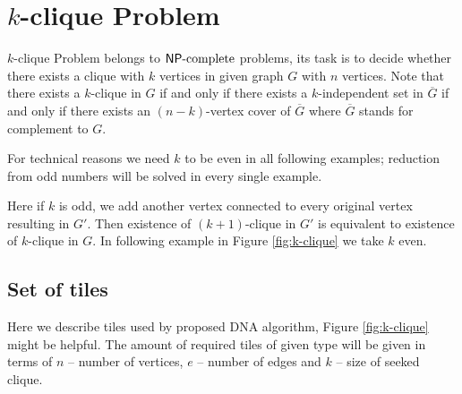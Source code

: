 \section{$k$-clique Problem}

$k$-clique Problem belongs to $\mathsf{NP}\textnormal{-complete}$ problems, its task is to decide whether there exists a clique with $k$ vertices in given graph $G$ with $n$ vertices. Note that there exists a $k$-clique in $G$ if and only if there exists a $k$-independent set in $\overline{G}$ if and only if there exists an $(n-k)$-vertex cover of $\overline{G}$ where $\overline{G}$ stands for complement to $G$.

For technical reasons we need $k$ to be even in all following examples; reduction from odd numbers will be solved in every single example.

Here if $k$ is odd, we add another vertex connected to every original vertex resulting in $G'$. Then existence of $(k+1)$-clique in $G'$ is equivalent to existence of $k$-clique in $G$. In following example in Figure \ref{fig:k-clique} we take $k$ even.


\subsection*{Set of tiles}

Here we describe tiles used by proposed DNA algorithm, Figure \ref{fig:k-clique} might be helpful. The amount of required tiles of given type will be given in terms of $n$ -- number of vertices, $e$ -- number of edges and $k$ -- size of seeked clique.

